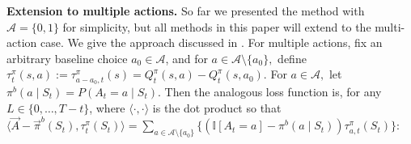 \documentclass[opre,nonblindrev]{informs4}
\newif\ifonecolumnequations
\let\arxivSavedArgmin\argmin
\let\argmin\undefined
\let\argmin\arxivSavedArgmin
\newcommand{\blipadv}{\tau}
\begin{document}
\textbf{Extension to multiple actions.}
So far we presented the method with $\mathcal{A}=\{0,1\}$ for simplicity, but all methods in this paper will extend to the multi-action case. We give the approach discussed in \citep{nie2021quasi}. For multiple actions, fix an arbitrary baseline choice $a_0 \in \mathcal{A}$, and for $a \in \mathcal{A}\setminus\{a_0\},$ define $\blipadv_{t}^\pi(s,a) := \blipadv_{a-a_0,t}^\pi(s) = {Q^\pi_t(s,a) -Q^\pi_t(s,a_0)}.$ For $a\in \mathcal{A},$ let $\pi^b(a\mid S_t)=P(A_t=a\mid S_t)$.  %
    Then the analogous loss function is, for any $L\in\{0,\ldots,T-t\}$, where $\langle \cdot , \cdot \rangle$ is the dot product so that $\langle \Vec{A} - \Vec{\pi}^b(S_t), \blipadv_{t}^\pi(S_t)
    \rangle =
    {\sum_{a\in \mathcal{A}\setminus\{a_0\}} \{(\mathbb I[A_t=a]- \pi^b(a\mid S_t) ) \blipadv_{a,t}^\pi(S_t) \}}$:
\end{document}
